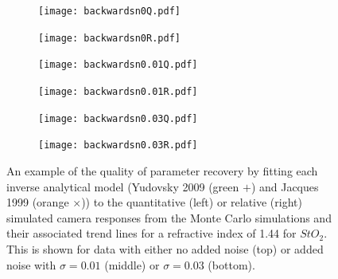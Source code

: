 \begin{figure}[h!]
    \centering
    \begin{subfigure}{0.49\textwidth}
        \texttt{[image: backwardsn0Q.pdf]}
        \caption{}
        \label{fig:backwardsn0Q}
    \end{subfigure}
    \begin{subfigure}{0.49\textwidth}
        \texttt{[image: backwardsn0R.pdf]}
        \caption{}
        \label{fig:backwardsn0R}
    \end{subfigure}
    \begin{subfigure}{0.49\textwidth}
        \texttt{[image: backwardsn0.01Q.pdf]}
        \caption{}
        \label{fig:backwardsn0.01Q}
    \end{subfigure}
    \begin{subfigure}{0.49\textwidth}
        \texttt{[image: backwardsn0.01R.pdf]}
        \caption{}
        \label{fig:backwardsm0.01R}
    \end{subfigure}
    \begin{subfigure}{0.49\textwidth}
        \texttt{[image: backwardsn0.03Q.pdf]}
        \caption{}
        \label{fig:backwardsn0.03Q}
    \end{subfigure}
    \begin{subfigure}{0.49\textwidth}
        \texttt{[image: backwardsn0.03R.pdf]}
        \caption{}
        \label{fig:backwardsm0.03R}
    \end{subfigure}
    \caption{An example of the quality of parameter recovery by fitting each inverse analytical model (Yudovsky 2009 (\textcolor{MyGreen}{green $+$}) and Jacques 1999 (\textcolor{MyOrange}{orange $\times$})) to the quantitative (left) or relative (right) simulated camera responses from the Monte Carlo simulations and their associated trend lines for a refractive index of 1.44 for $StO_2$. This is shown for data with either no added noise (top) or added noise with $\sigma = 0.01$ (middle) or $\sigma = 0.03$ (bottom).}
    \label{fig:backwardsHSIMC1}
\end{figure}


